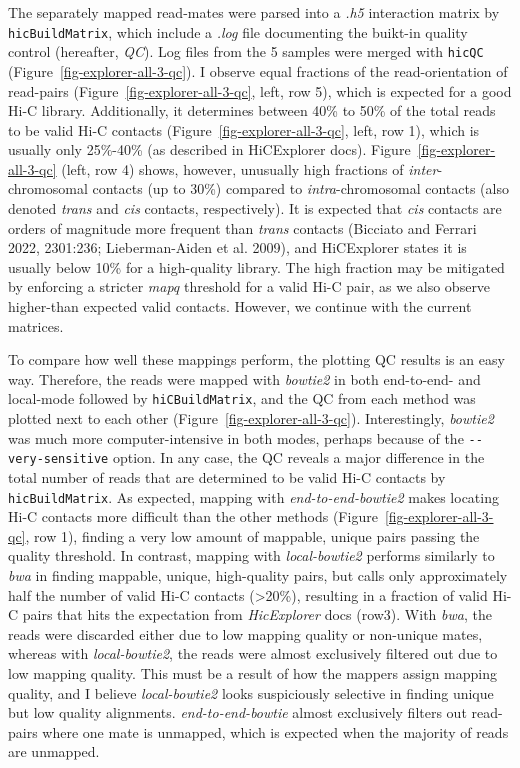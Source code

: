 \documentclass[
  11pt,
  a4paper,
]{scrbook}
\begin{document}
The separately mapped read-mates were parsed into a \emph{.h5}
interaction matrix by \texttt{hicBuildMatrix}, which include a
\emph{.log} file documenting the buikt-in quality control (hereafter,
\emph{QC}). Log files from the 5 samples were merged with \texttt{hicQC}
(Figure~\ref{fig-explorer-all-3-qc}). I observe equal fractions of the
read-orientation of read-pairs (Figure~\ref{fig-explorer-all-3-qc},
left, row 5), which is expected for a good Hi-C library. Additionally,
it determines between 40\% to 50\% of the total reads to be valid Hi-C
contacts (Figure~\ref{fig-explorer-all-3-qc}, left, row 1), which is
usually only 25\%-40\% (as described in HiCExplorer docs).
Figure~\ref{fig-explorer-all-3-qc} (left, row 4) shows, however,
unusually high fractions of \emph{inter}-chromosomal contacts (up to
30\%) compared to \emph{intra}-chromosomal contacts (also denoted
\emph{trans} and \emph{cis} contacts, respectively). It is expected that
\emph{cis} contacts are orders of magnitude more frequent than
\emph{trans} contacts (Bicciato and Ferrari 2022, 2301:236;
Lieberman-Aiden et al. 2009), and HiCExplorer states it is usually below
10\% for a high-quality library. The high fraction may be mitigated by
enforcing a stricter \emph{mapq} threshold for a valid Hi-C pair, as we
also observe higher-than expected valid contacts. However, we continue
with the current matrices.

To compare how well these mappings perform, the plotting QC results is
an easy way. Therefore, the reads were mapped with \emph{bowtie2} in
both end-to-end- and local-mode followed by \texttt{hiCBuildMatrix}, and
the QC from each method was plotted next to each other
(Figure~\ref{fig-explorer-all-3-qc}). Interestingly, \emph{bowtie2} was
much more computer-intensive in both modes, perhaps because of the
\texttt{-\/-very-sensitive} option. In any case, the QC reveals a major
difference in the total number of reads that are determined to be valid
Hi-C contacts by \texttt{hicBuildMatrix}. As expected, mapping with
\emph{end-to-end-bowtie2} makes locating Hi-C contacts more difficult
than the other methods (Figure~\ref{fig-explorer-all-3-qc}, row 1),
finding a very low amount of mappable, unique pairs passing the quality
threshold. In contrast, mapping with \emph{local-bowtie2} performs
similarly to \emph{bwa} in finding mappable, unique, high-quality pairs,
but calls only approximately half the number of valid Hi-C contacts
(\textgreater20\%), resulting in a fraction of valid Hi-C pairs that
hits the expectation from \emph{HicExplorer} docs (row3). With
\emph{bwa}, the reads were discarded either due to low mapping quality
or non-unique mates, whereas with \emph{local-bowtie2}, the reads were
almost exclusively filtered out due to low mapping quality. This must be
a result of how the mappers assign mapping quality, and I believe
\emph{local-bowtie2} looks suspiciously selective in finding unique but
low quality alignments. \emph{end-to-end-bowtie} almost exclusively
filters out read-pairs where one mate is unmapped, which is expected
when the majority of reads are unmapped.
\end{document}
